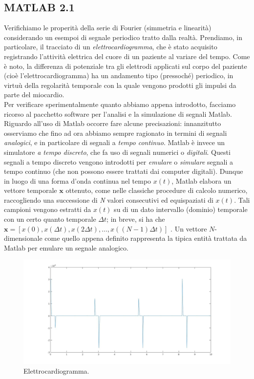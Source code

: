 \documentclass[12pt,oneside,openany]{memoir}
\numberwithin{equation}{subsection}
\begin{document}
\newpage
\subsection{MATLAB 2.1}
Verifichiamo le properit\`a della serie di Fourier (simmetria e linearit\`a)
considerando un esempoi di segnale periodico tratto dalla realt\`a. Prendiamo,
in particolare, il tracciato di un \textit{elettrocardiogramma}, che \`e stato
acquisito registrando l'attivit\`a elettrica del cuore di un paziente al variare
del tempo. Come \`e noto, la differenza di potenziale tra gli elettrodi
applicati sul corpo del paziente (cio\`e l'elettrocardiogramma) ha un andamento
tipo (pressoch\'e) periodico, in virtu\`u della regolarit\`a temporale con la
quale vengono prodotti gli impulsi da parte del miocardio.\\
Per verificare sperimentalmente quanto abbiamo appena introdotto, facciamo
ricorso al pacchetto software per l'analisi e la simulazione di segnali Matlab.
Riguardo all'uso di Matlab occorre fare alcune precisazioni: innanzitutto
osserviamo che fino ad ora abbiamo sempre ragionato in termini di segnali
\textit{analogici}, e in particolare di segnali a \textit{tempo continuo}.
Matlab \`e invece un simulatore \textit{a tempo discreto}, che fa uso di segnali
numerici o \textit{digitali}. Questi segnali a tempo discreto vengono introdotti
per \textit{emulare} o \textit{simulare} segnali a tempo continuo (che non
possono essere trattati dai computer digitali). Dunque in luogo di una forma
d'onda continua nel tempo $x(t)$, Matlab elabora un vettore temporale
$\boldsymbol{x}$ ottenuto, come nelle classiche procedure di calcolo numerico,
raccogliendo una successione di \textit{N} valori consecutivi ed equispaziati di
$x(t)$. Tali campioni vengono estratti da $x(t)$ su di un dato intervallo
(dominio) temporale con un certo quanto temporale $\Delta t$; in breve, si ha
che
$\boldsymbol{x} = [x(0), x(\Delta t), x(2 \Delta t), \dots, x((N - 1)\Delta t)]$
. Un vettore $N$-dimensionale come quello appena definito rappresenta la tipica
entit\`a trattata da Matlab per emulare un segnale analogico.
\begin{figure}[H]
	\centering
	\captionsetup{justification=centering}
	\includegraphics[width=1.0\textwidth]{images/matlab_ecg_signal.jpg}
	\caption{Elettrocardiogramma.}
\end{figure}
\end{document}
